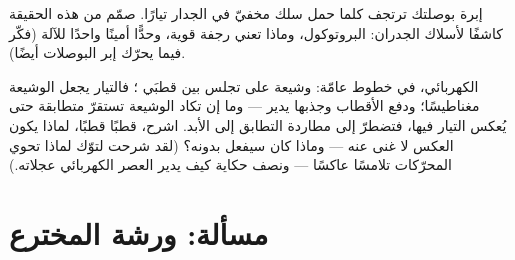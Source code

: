 \begin{exercise}[$\star\star$]\label{exo:g8:electric-current-effects:11}
إبرة بوصلتك ترتجف كلما حمل سلك مخفيّ في الجدار تيارًا. صمّم من
هذه الحقيقة كاشفًا لأسلاك الجدران: البروتوكول، وماذا تعني رجفة
قوية، وحدًّا أمينًا واحدًا للآلة (فكّر فيما يحرّك إبر البوصلات
أيضًا).
\end{exercise}

\begin{exercise}[$\star\star\star$]\label{exo:g8:electric-current-effects:12}
 الكهربائي، في خطوط عامّة: وشيعة على  تجلس بين قطبَي
؛ فالتيار يجعل الوشيعة مغناطيسًا؛ ودفع الأقطاب وجذبها
يدير  --- وما إن تكاد الوشيعة تستقرّ متطابقة حتى يُعكس
التيار فيها، فتضطرّ إلى مطاردة التطابق إلى الأبد. اشرح، قطبًا
قطبًا، لماذا يكون العكس لا غنى عنه --- وماذا كان  سيفعل
بدونه؟ (لقد شرحت لتوّك لماذا تحوي المحرّكات تلامسًا عاكسًا ---
ونصف حكاية كيف يدير العصر الكهربائي عجلاته.)
\end{exercise}

\section{مسألة: ورشة المخترع}

